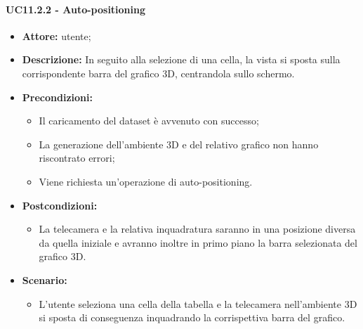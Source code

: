 \paragraph{UC11.2.2 - Auto-positioning}
\begin{itemize}    
    \item \textbf{Attore:} utente;
    \item \textbf{Descrizione:} In seguito alla selezione di una cella, la vista si sposta sulla corrispondente barra del grafico 3D, centrandola sullo schermo.
    \item \textbf{Precondizioni:}    
        \begin{itemize}
            \item Il caricamento del dataset è avvenuto con successo;
            \item La generazione dell'ambiente 3D e del relativo grafico non hanno riscontrato errori;
            \item Viene richiesta un'operazione di auto-positioning.
        \end{itemize}    
    \item \textbf{Postcondizioni:}
        \begin{itemize}
            \item La telecamera e la relativa inquadratura saranno in una posizione diversa da quella iniziale e avranno inoltre in primo piano la barra selezionata del grafico 3D.
        \end{itemize}    
    \item \textbf{Scenario:} 
        \begin{itemize}
            \item L'utente seleziona una cella della tabella e la telecamera nell'ambiente 3D si sposta di conseguenza inquadrando la corrispettiva barra del grafico.
        \end{itemize}
\end{itemize}

